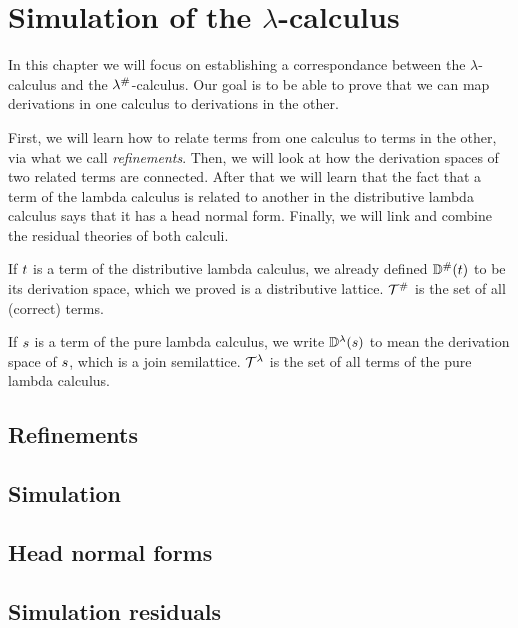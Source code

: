 
\chapter{Simulation of the $\lambda$-calculus}

In this chapter we will focus on establishing a correspondance between
the $\lambda$-calculus and the $\lambda^{\mathtt{\#}}$-calculus.
Our goal is to be able to prove that we can map derivations in one calculus
to derivations in the other.

First, we will learn how to relate terms from one calculus to terms in the other,
via what we call \emph{refinements}.
Then, we will look at how the derivation spaces of two related terms are connected.
After that we will learn that the fact that a term of the lambda calculus is
related to another in the distributive lambda calculus
says that it has a head normal form.
Finally, we will link and combine the residual theories of both calculi.


\begin{notation}
If $t$ is a term of the distributive lambda calculus,
we already defined $\mathbb{D}^{\mathtt{\#}}(t)$ to be its derivation space,
which we proved is a distributive lattice.
$\mathcal{T}^{\mathtt{\#}}$ is the set of all (correct) terms.

If $s$ is a term of the pure lambda calculus,
we write $\mathbb{D}^{\lambda}(s)$ to mean
the derivation space of $s$, which
is a join semilattice.
$\mathcal{T}^{\lambda}$ is the set of all terms of the pure lambda calculus.
\end{notation}


\section{Refinements}


\section{Simulation}


\section{Head normal forms}


\section{Simulation residuals}

